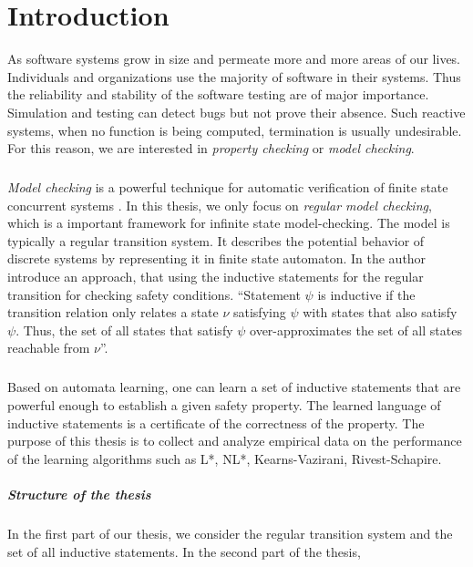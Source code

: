 
\chapter{Introduction}\label{chapter:introduction}
As software systems grow in size and permeate more and more areas of our lives.
Individuals and organizations use the majority of software in their systems. Thus the 
reliability and stability of the software testing are of major importance. Simulation 
and testing can detect bugs but not prove their absence. Such reactive 
systems, when no function is being computed, termination is usually undesirable. For 
this reason, we are interested in \textit{property checking} or \textit{model checking}. 

\paragraph*{}
\textit{Model checking} is a powerful technique for automatic verification of finite state 
concurrent systems \cite{clarke2009model}. 
In this thesis, we only focus on \textit{regular model checking}, which is a important 
framework for infinite state model-checking. The model is typically a regular 
transition system. It describes the potential behavior of discrete systems by representing 
it in finite state automaton. In \cite{clarke2009model} the author introduce an approach, 
that using the inductive statements for the regular transition for checking 
safety conditions. ``Statement $\psi$ is inductive if the transition relation only relates 
a state $\nu$ satisfying $\psi$ with states that also satisfy $\psi$. Thus, the set of 
all states that satisfy $\psi$ over-approximates the set of all states reachable from $\nu$''.

\paragraph*{}
Based on automata learning, one can learn a set of inductive statements that are powerful 
enough to establish a given safety property.
The learned language of inductive statements is a certificate of the correctness of the 
property. The purpose of this thesis is to collect and analyze empirical data on 
the performance of the learning algorithms such as L*, NL*, Kearns-Vazirani, Rivest-Schapire.


\paragraph*{Structure of the thesis}
\paragraph*{}

In the first part of our thesis, we consider the regular transition system and 
the set of all inductive statements. In the second part of the thesis,